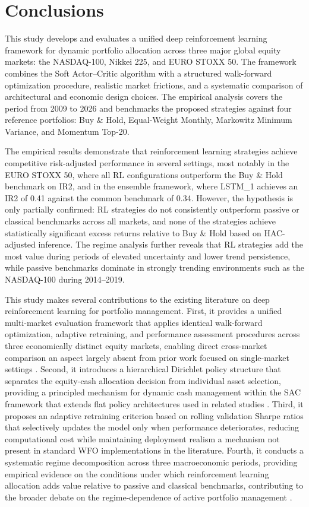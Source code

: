 \documentclass[]{elsarticle}
\begin{document}
\hypertarget{conclusions}{%
\section{Conclusions}\label{conclusions}}

This study develops and evaluates a unified deep reinforcement learning framework for dynamic portfolio allocation across three major global equity markets: the NASDAQ-100, Nikkei 225, and EURO STOXX 50. The framework combines the Soft Actor--Critic algorithm with a structured walk-forward optimization procedure, realistic market frictions, and a systematic comparison of architectural and economic design choices. The empirical analysis covers the period from 2009 to 2026 and benchmarks the proposed strategies against four reference portfolios: Buy \& Hold, Equal-Weight Monthly, Markowitz Minimum Variance, and Momentum Top-20.

The empirical results demonstrate that reinforcement learning strategies achieve competitive risk-adjusted performance in several settings, most notably in the EURO STOXX 50, where all RL configurations outperform the Buy \& Hold benchmark on IR2, and in the ensemble framework, where LSTM\_1 achieves an IR2 of 0.41 against the common benchmark of 0.34. However, the hypothesis is only partially confirmed: RL strategies do not consistently outperform passive or classical benchmarks across all markets, and none of the strategies achieve statistically significant excess returns relative to Buy \& Hold based on HAC-adjusted inference. The regime analysis further reveals that RL strategies add the most value during periods of elevated uncertainty and lower trend persistence, while passive benchmarks dominate in strongly trending environments such as the NASDAQ-100 during 2014--2019.

This study makes several contributions to the existing literature on deep reinforcement learning for portfolio management. First, it provides a unified multi-market evaluation framework that applies identical walk-forward optimization, adaptive retraining, and performance assessment procedures across three economically distinct equity markets, enabling direct cross-market comparison an aspect largely absent from prior work focused on single-market settings \citep{yang2020deep, JIANG2024101016}. Second, it introduces a hierarchical Dirichlet policy structure that separates the equity-cash allocation decision from individual asset selection, providing a principled mechanism for dynamic cash management within the SAC framework that extends flat policy architectures used in related studies \citep{Hambly_2023}. Third, it proposes an adaptive retraining criterion based on rolling validation Sharpe ratios that selectively updates the model only when performance deteriorates, reducing computational cost while maintaining deployment realism a mechanism not present in standard WFO implementations in the literature. Fourth, it conducts a systematic regime decomposition across three macroeconomic periods, providing empirical evidence on the conditions under which reinforcement learning allocation adds value relative to passive and classical benchmarks, contributing to the broader debate on the regime-dependence of active portfolio management \citep{DE_MIGEUL}.
\end{document}
